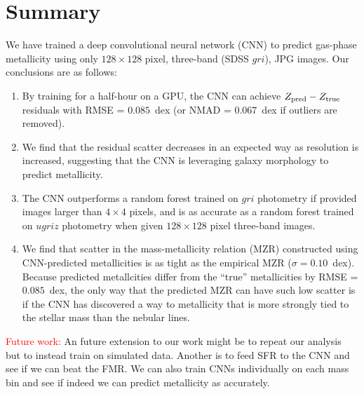 \documentclass[fleqn,usenatbib]{mnras}
\newcommand{\editorial}[1]{\textcolor{red}{#1}}
\begin{document}
\section{Summary}\label{sec:summary}

We have trained a deep convolutional neural network (CNN) to predict gas-phase metallicity using only $128 \times 128$ pixel, three-band (SDSS $gri$), JPG images.
Our conclusions are as follows:
\begin{enumerate}
	\item By training for a half-hour on a GPU, the CNN can achieve $Z_{\rm pred} - Z_{\rm true}$ residuals with RMSE = $0.085$~dex (or NMAD = $0.067$~dex if outliers are removed).

	\item We find that the residual scatter decreases in an expected way as resolution is increased, suggesting that the CNN is leveraging galaxy morphology to predict metallicity.

	\item The CNN outperforms a random forest trained on $gri$ photometry if provided images larger than $4\times 4$ pixels, and is as accurate as a random forest trained on $ugriz$ photometry when given $128 \times 128$ pixel three-band images.

	\item We find that scatter in the mass-metallicity relation (MZR) constructed using CNN-predicted metallicities is as tight as the empirical MZR ($\sigma = 0.10$~dex).
	Because predicted metallcities differ from the ``true'' metallicities by RMSE = $0.085$~dex, the only way that the predicted MZR can have such low scatter is if the CNN has discovered a way to metallicity that is more strongly tied to the stellar mass than the nebular lines.
\end{enumerate}

\editorial{Future work:}
An future extension to our work might be to repeat our analysis but to instead train on simulated data.
Another is to feed SFR to the CNN and see if we can beat the FMR.
We can also train CNNs individually on each mass bin and see if indeed we can predict metallicity as accurately.
\end{document}
